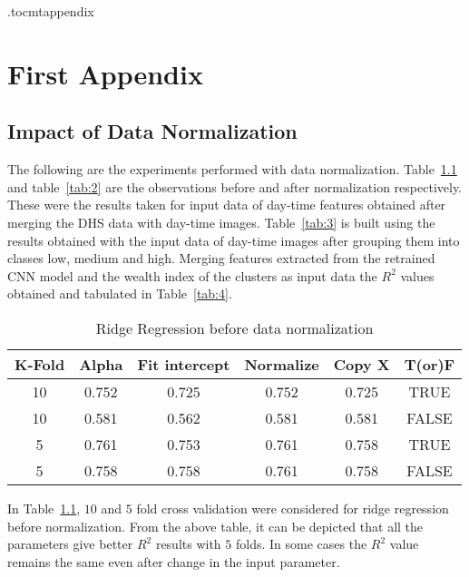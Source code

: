 \newpage
\appendix
\newpage
\etocdepthtag.toc{mtappendix}
\tableofcontents
\newpage


\chapter{First Appendix}


\section{Impact of Data Normalization}

The following are the experiments performed with data normalization. Table~\ref{tab:1} and table~\ref{tab:2} are the observations before and after normalization respectively. These were the results taken for input data of day-time features obtained after merging the DHS data with day-time images. Table~\ref{tab:3} is built using the results obtained with the input data of day-time images after grouping them into classes low, medium and high. Merging features extracted from the retrained \ac{CNN} model and the wealth index of the clusters as input data the \(R^2\) values obtained and tabulated in Table~\ref{tab:4}.


\begin{table}[h!]

\caption {Ridge Regression before data normalization} \label{tab:1} 
\begin{center}
\begin{tabular}{|c|c|c|c|c|c|} 
\hline
K-Fold & Alpha & Fit intercept & Normalize & Copy X & T(or)F    \\
\hline \hline
10 & 0.752 & 0.725 & 0.752 & 0.725 & TRUE \\ 
10& 0.581 & 0.562 & 0.581 & 0.581 & FALSE \\ 
5 & 0.761 & 0.753 & 0.761 & 0.758 & TRUE  \\ 
5 & 0.758 & 0.758 & 0.761 & 0.758 & FALSE  \\ 
\hline \hline
\end{tabular}
\end{center}
\end{table}

In {Table~\ref{tab:1}}, $10$ and $5$ fold cross validation were considered for ridge regression before normalization. From the above table, it can be depicted that all the parameters give better \(R^2\) results with $5$ folds. In some cases the \(R^2\) value remains the same even after change in the input parameter. 


